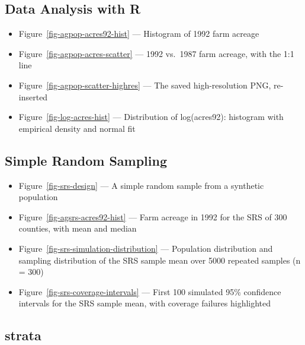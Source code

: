 \documentclass[
  letterpaper,
  DIV=11,
  numbers=noendperiod]{scrreprt}
\providecommand{\tightlist}{%
  \setlength{\itemsep}{0pt}\setlength{\parskip}{0pt}}
\renewcommand{\[}{\begin{equation}}
\renewcommand{\]}{\end{equation}}
\begin{document}
\subsection{Data Analysis with R}\label{data-analysis-with-r-1}

\begin{itemize}
\tightlist
\item
  Figure~\ref{fig-agpop-acres92-hist} --- Histogram of 1992 farm acreage
\item
  Figure~\ref{fig-agpop-acres-scatter} --- 1992 vs.~1987 farm acreage,
  with the 1:1 line
\item
  Figure~\ref{fig-agpop-scatter-highres} --- The saved high-resolution
  PNG, re-inserted
\item
  Figure~\ref{fig-log-acres-hist} --- Distribution of log(acres92):
  histogram with empirical density and normal fit
\end{itemize}

\subsection{Simple Random Sampling}\label{simple-random-sampling-1}

\begin{itemize}
\tightlist
\item
  Figure~\ref{fig-srs-design} --- A simple random sample from a
  synthetic population
\item
  Figure~\ref{fig-agsrs-acres92-hist} --- Farm acreage in 1992 for the
  SRS of 300 counties, with mean and median
\item
  Figure~\ref{fig-srs-simulation-distribution} --- Population
  distribution and sampling distribution of the SRS sample mean over
  5000 repeated samples (n = 300)
\item
  Figure~\ref{fig-srs-coverage-intervals} --- First 100 simulated 95\%
  confidence intervals for the SRS sample mean, with coverage failures
  highlighted
\end{itemize}

\subsection{strata}\label{strata}
\end{document}
